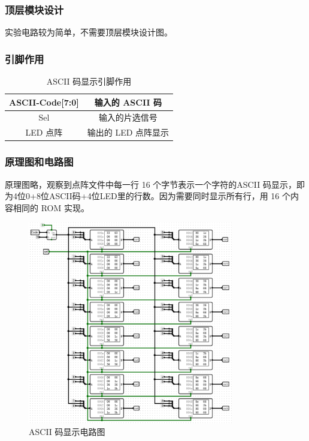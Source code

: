 \documentclass{article}
\begin{document}
    \subsubsection{顶层模块设计}
    实验电路较为简单，不需要顶层模块设计图。

    \subsubsection{引脚作用}
    \begin{table}[H]
    \centering
    \begin{tabular}{|c|c|}
        \hline
        ASCII-Code[7:0]   & 输入的 ASCII 码 \\ \hline
        Sel   & 输入的片选信号 \\ \hline
        LED 点阵   & 输出的 LED 点阵显示 \\ \hline
    \end{tabular}
    \caption{ASCII 码显示引脚作用}
    \end{table}

    \subsubsection{原理图和电路图}
    原理图略，观察到点阵文件中每一行 16 个字节表示一个字符的ASCII 码显示，即为4位0+8位ASCII码+4位LED里的行数。因为需要同时显示所有行，用 16 个内容相同的 ROM 实现。

    \begin{figure}[H]
    \centering
    \includegraphics[width=0.8\textwidth]{2.4.2.png}
    \caption{ASCII 码显示电路图}
    \end{figure}
\end{document}
